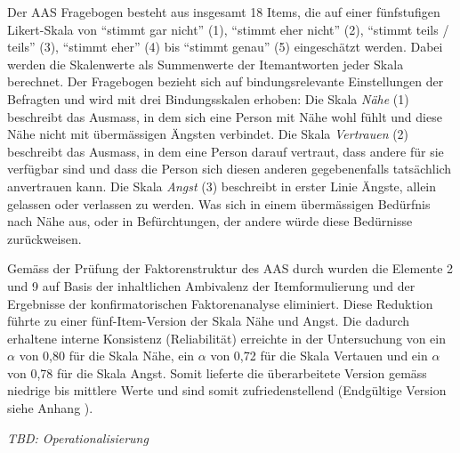 Der AAS Fragebogen besteht aus insgesamt 18 Items, die auf einer fünfstufigen Likert-Skala von \enquote{stimmt gar nicht} (1), \enquote{stimmt eher nicht} (2), \enquote{stimmt teils / teils} (3), \enquote{stimmt eher} (4) bis \enquote{stimmt genau} (5) eingeschätzt werden. Dabei werden die Skalenwerte als Summenwerte der Itemantworten jeder Skala berechnet. Der Fragebogen bezieht sich auf bindungsrelevante Einstellungen der Befragten und wird mit drei Bindungsskalen erhoben: Die Skala \textit{Nähe} (1) beschreibt das Ausmass, in dem sich eine Person mit Nähe wohl fühlt und diese Nähe nicht mit übermässigen Ängsten verbindet. Die Skala \textit{Vertrauen} (2) beschreibt das Ausmass, in dem eine Person darauf vertraut, dass andere für sie verfügbar sind und dass die Person sich diesen anderen gegebenenfalls tatsächlich anvertrauen kann. Die Skala \textit{Angst} (3) beschreibt in erster Linie Ängste, allein gelassen oder verlassen zu werden. Was sich in einem übermässigen Bedürfnis nach Nähe aus, oder in Befürchtungen, der andere würde diese Bedürnisse zurückweisen. 

Gemäss der Prüfung der Faktorenstruktur des AAS durch  wurden die Elemente 2 und 9 auf Basis der inhaltlichen Ambivalenz der Itemformulierung und der Ergebnisse der konfirmatorischen Faktorenanalyse eliminiert. Diese Reduktion führte zu einer fünf-Item-Version der Skala Nähe und Angst. Die dadurch erhaltene interne Konsistenz (Reliabilität) erreichte in der Untersuchung von  ein $\alpha$ von 0,80 für die Skala Nähe, ein $\alpha$ von 0,72 für die Skala Vertauen und ein $\alpha$ von 0,78 für die Skala Angst. Somit lieferte die überarbeitete Version gemäss  niedrige bis mittlere Werte und sind somit zufriedenstellend (Endgültige Version siehe Anhang ).

\textit{TBD: Operationalisierung}


